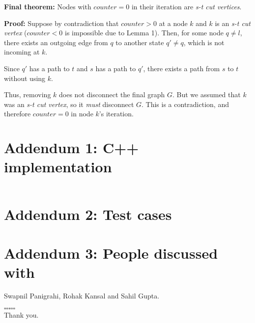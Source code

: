 \documentclass{article}
\begin{document}
\begin{itemize}
\textbf{Final theorem:} Nodes with $counter = 0$ in their iteration are \emph{s-t cut vertices}.

\textbf{Proof:} Suppose by contradiction that $counter > 0$ at a node $k$ and $k$ is an \emph{s-t cut vertex} ($counter < 0$ is impossible due to Lemma 1). Then, for some node $q \neq l$, there exists an outgoing edge from $q$ to another state $q' \neq q$, which is not incoming at $k$.

Since $q'$ has a path to $t$ and $s$ has a path to $q'$, there exists a path from $s$ to $t$ without using $k$. 

Thus, removing $k$ does not disconnect the final graph $G$. But we assumed that $k$ was an \emph{s-t cut vertex}, so it \emph{must} disconnect $G$. This is a contradiction, and therefore $counter = 0$ in node $k$'s iteration.

\end{itemize}



\section*{Addendum 1: C++ implementation}

\inputminted{cpp}{stcut.cpp}

\section*{Addendum 2: Test cases}




\section*{Addendum 3: People discussed with}

Swapnil Panigrahi, Rohak Kansal and Sahil Gupta.


\vspace*{\fill}
\begin{center}
    $\square \square \square \square \square$
    \\
    Thank you.
\end{center}
\vspace*{\fill}
\end{document}
